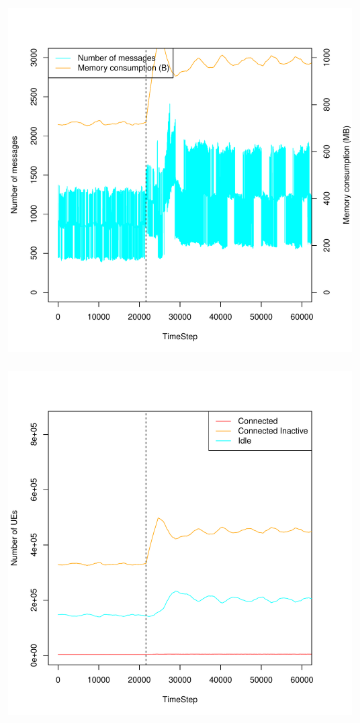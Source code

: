 \documentclass[a4j]{ujarticle}
\begin{document}
\begin{figure}[htbp]
\begin{subfigure}{0.49\hsize}
   \label{subfig:scenario_6_idleTimer_345600_691200_1-5_0_0_0_ideal_add_180000}
 \end{subfigure}
 \par\bigskip %
 \begin{subfigure}{0.49\hsize}
   \centering
   \includegraphics[width=1.0\hsize]{scenario_6_signaling_and_memoryload_vs_timeStep_345600_691200_1-5_0_0_0_ideal_add_180000.pdf}
   \label{subfig:scenario_6_signaling_and_memoryload_vs_timeStep_345600_691200_1-5_0_0_0_ideal_add_180000}
 \end{subfigure}
 \begin{subfigure}{0.49\hsize}
   \centering
   \includegraphics[width=1.0\hsize]{scenario_6_stateBreakdown_345600_691200_1-5_0_0_0_ideal_add_180000.pdf}

\end{subfigure}
\end{figure}
\end{document}
